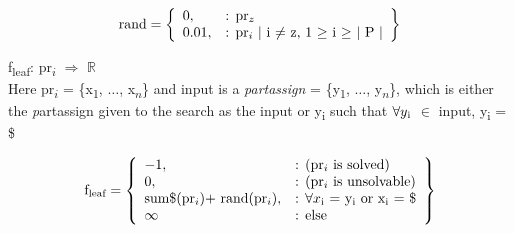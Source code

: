\documentclass[11pt, oneside]{article}   	%
\begin{document}
    \[
        \text{rand} = \left\{\begin{array}{ll}
            0, & \text{: pr\textsubscript{$z$}}\\
            0.01, & \text{: pr\textsubscript{$i$} $\vert$ i $\neq$ z, 1 $\geq$ i $\geq$ $\vert$ P $\vert$}\\
            \end{array}\right\}
      \]

\noindent f\textsubscript{leaf}: pr\textsubscript{$i$} $\Rightarrow$ $\mathbb{R}$\\

\noindent Here  pr\textsubscript{$i$} = \{x\textsubscript{1}, $\dots$, x\textsubscript{$n$}\} and input is a \textit {partassign} = \{y\textsubscript{1}, $\dots$, y\textsubscript{$n$}\}, which is either the \textit partassign given to the search as the input or y\textsubscript{i} such that $\forall y\textsubscript{i}$ $\in$ input, y\textsubscript{i} = \$

    \[
        \text{f\textsubscript{leaf}} = \left\{\begin{array}{ll}
            -1, & \text{: (pr\textsubscript{$i$} is solved)}\\
            0, & \text{: (pr\textsubscript{$i$} is unsolvable)}\\
            \text{sum$\$$(pr\textsubscript{$i$})+ rand(pr\textsubscript{$i$})}, & \text{: $\forall x\textsubscript{i}$ = y\textsubscript{i} or x\textsubscript{i} = \$}\\
	\infty & \text{: else}
            \end{array}\right\}
      \]
\end{document}

